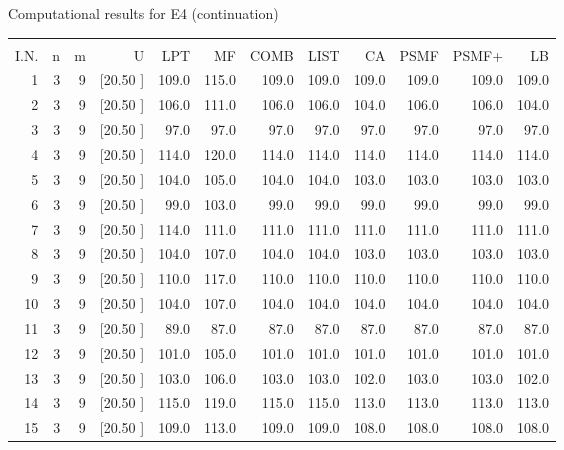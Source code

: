 \documentclass[12pt,a4paper]{article}
\begin{document}
\newpage
\begin{center}
 Computational results for E4 (continuation) {\tiny
\begin{tabular}{r r r r r r r r r r r r}\hline
    &   &   &          &        &        &        &        &        &        &        &       \\[-0.1in]
  I.N.  &  n  &  m  &  U  &  LPT  &  MF  &  COMB  &  LIST  &  CA  & PSMF &PSMF+ & LB \\[0.03in]
\hline
   1&  3&  9&[20.50     ]&   109.0&   115.0&   109.0&   109.0&   109.0&   109.0&   109.0&   109.0\\[-0.02in]
   2&  3&  9&[20.50     ]&   106.0&   111.0&   106.0&   106.0&   104.0&   106.0&   106.0&   104.0\\[-0.02in]
   3&  3&  9&[20.50     ]&    97.0&    97.0&    97.0&    97.0&    97.0&    97.0&    97.0&    97.0\\[-0.02in]
   4&  3&  9&[20.50     ]&   114.0&   120.0&   114.0&   114.0&   114.0&   114.0&   114.0&   114.0\\[-0.02in]
   5&  3&  9&[20.50     ]&   104.0&   105.0&   104.0&   104.0&   103.0&   103.0&   103.0&   103.0\\[-0.02in]
   6&  3&  9&[20.50     ]&    99.0&   103.0&    99.0&    99.0&    99.0&    99.0&    99.0&    99.0\\[-0.02in]
   7&  3&  9&[20.50     ]&   114.0&   111.0&   111.0&   111.0&   111.0&   111.0&   111.0&   111.0\\[-0.02in]
   8&  3&  9&[20.50     ]&   104.0&   107.0&   104.0&   104.0&   103.0&   103.0&   103.0&   103.0\\[-0.02in]
   9&  3&  9&[20.50     ]&   110.0&   117.0&   110.0&   110.0&   110.0&   110.0&   110.0&   110.0\\[-0.02in]
  10&  3&  9&[20.50     ]&   104.0&   107.0&   104.0&   104.0&   104.0&   104.0&   104.0&   104.0\\[-0.02in]
  11&  3&  9&[20.50     ]&    89.0&    87.0&    87.0&    87.0&    87.0&    87.0&    87.0&    87.0\\[-0.02in]
  12&  3&  9&[20.50     ]&   101.0&   105.0&   101.0&   101.0&   101.0&   101.0&   101.0&   101.0\\[-0.02in]
  13&  3&  9&[20.50     ]&   103.0&   106.0&   103.0&   103.0&   102.0&   103.0&   103.0&   102.0\\[-0.02in]
  14&  3&  9&[20.50     ]&   115.0&   119.0&   115.0&   115.0&   113.0&   113.0&   113.0&   113.0\\[-0.02in]
  15&  3&  9&[20.50     ]&   109.0&   113.0&   109.0&   109.0&   108.0&   108.0&   108.0&   108.0\\[-0.02in]

\end{tabular}}
\end{center}
\end{document}
